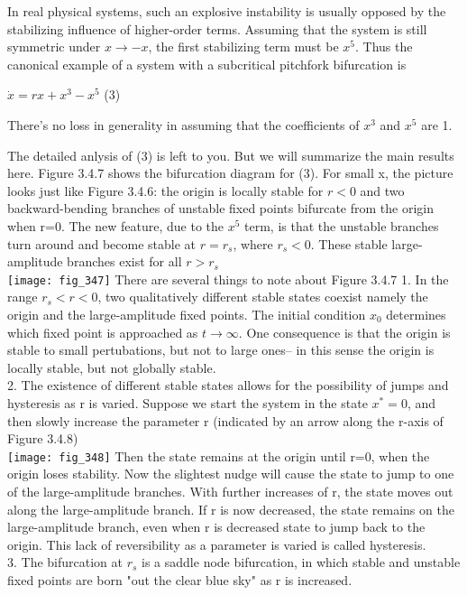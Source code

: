 \documentclass{article}
\newcommand\tab[1][1cm]{\hspace*{#1}}
\begin{document}
In real physical systems, such an explosive instability is usually opposed by the stabilizing influence of higher-order terms. Assuming that the system is still symmetric under $x \to -x$, the first stabilizing term must be $x^{5}$. Thus the canonical example of a system with a subcritical pitchfork bifurcation is 
\begin{center}
$\dot{x}=rx+x^{3}-x^{5}$ \tab (3)
\end{center}
There's no loss in generality in assuming that the coefficients of $x^{3}$ and $x^{5}$ are 1.

The detailed anlysis of (3) is left to you. But we will summarize the main results here. Figure 3.4.7 shows the bifurcation diagram for (3). For small x, the picture looks just like Figure 3.4.6: the origin is locally stable for $r<0$ and two backward-bending branches of unstable fixed points bifurcate from the origin when r=0. The new feature, due to the $x^{5}$ term, is that the unstable branches turn around and become stable at $r=r_{s}$, where $r_{s}<0$. These stable large-amplitude branches exist for all $r>r_{s}$ \\
\texttt{[image: fig\_347]}
There are several things to note about Figure 3.4.7
\tab 1. In the range $r_{s}<r<0$, two qualitatively different stable states coexist namely the origin and the large-amplitude fixed points. The initial condition $x_{0}$ determines which fixed point is approached as $t \to \infty$. One consequence is that the origin is stable to small pertubations, but not to large ones-- in this sense the origin is locally stable, but not globally stable. \\
\tab 2. The existence of different stable states allows for the possibility of jumps and hysteresis as r is varied. Suppose we start the system in the state $x^{*}=0$, and then slowly increase the parameter r (indicated by an arrow along the r-axis of Figure 3.4.8) \\
\texttt{[image: fig\_348]}
Then the state remains at the origin until r=0, when the origin loses stability. Now the slightest nudge will cause the state to jump to one of the large-amplitude branches. With further increases of r, the state moves out along the large-amplitude branch. If r is now decreased, the state remains on the large-amplitude branch, even when r is decreased state to jump back to the origin. This lack of reversibility as a parameter is varied is called hysteresis. \\
\tab 3. The bifurcation at $r_{s}$ is a saddle node bifurcation, in which stable and unstable fixed points are born "out the clear blue sky" as r is increased.
\end{document}
